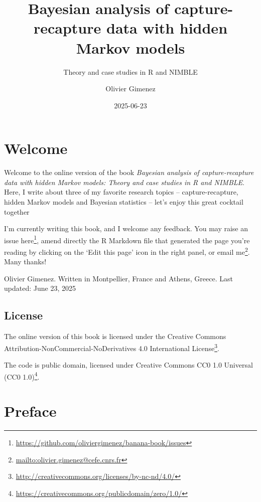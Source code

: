 \documentclass[
  12pt,
]{krantz}
\title{Bayesian analysis of capture-recapture data with hidden Markov models}
\subtitle{Theory and case studies in R and NIMBLE}
\author{Olivier Gimenez}
\date{2025-06-23}
\renewcommand{\href}[2]{#2\footnote{\url{#1}}}
\begin{document}
\maketitle

\thispagestyle{empty}

\setlength{\abovedisplayskip}{-5pt}
\setlength{\abovedisplayshortskip}{-5pt}

{
\hypersetup{linkcolor=}
\setcounter{tocdepth}{2}
\tableofcontents
}
\listoffigures
\listoftables
\chapter*{Welcome}\label{welcome}


Welcome to the online version of the book \emph{Bayesian analysis of capture-recapture data with hidden Markov models: Theory and case studies in R and NIMBLE}. Here, I write about three of my favorite research topics -- capture-recapture, hidden Markov models and Bayesian statistics -- let's enjoy this great cocktail together 🍹

I'm currently writing this book, and I welcome any feedback. You may raise an issue \href{https://github.com/oliviergimenez/banana-book/issues}{here}, amend directly the R Markdown file that generated the page you're reading by clicking on the `Edit this page' icon in the right panel, or \href{mailto:olivier.gimenez@cefe.cnrs.fr}{email me}. Many thanks!

Olivier Gimenez. Written in Montpellier, France and Athens, Greece.
Last updated: June 23, 2025

\section*{License}\label{license}


The online version of this book is licensed under the \href{http://creativecommons.org/licenses/by-nc-nd/4.0/}{Creative Commons Attribution-NonCommercial-NoDerivatives 4.0 International License}.

The code is public domain, licensed under \href{https://creativecommons.org/publicdomain/zero/1.0/}{Creative Commons CC0 1.0 Universal (CC0 1.0)}.

\chapter*{Preface}\label{preface}
\end{document}
